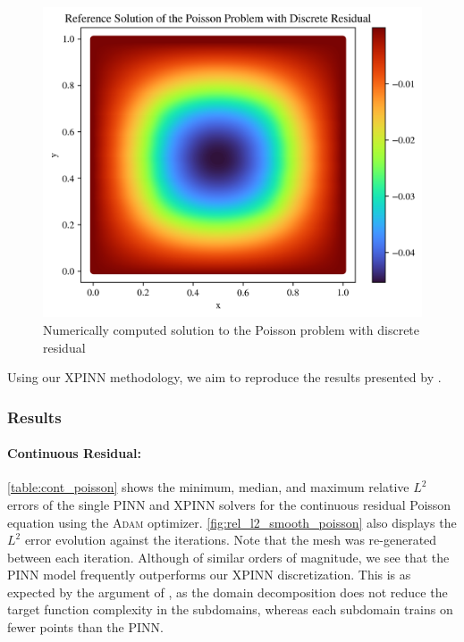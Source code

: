 \begin{figure}
    \centering
    \includegraphics{Project1XPINNs/figures/Poisson/Exact_Discrete.png}
    \caption{Numerically computed solution to the Poisson problem with discrete residual}
    \label{fig:exact_discrete}
\end{figure}


Using our XPINN methodology, we aim to reproduce the results presented by \textcite{XPINN_generalize}.

\subsubsection{Results}
\paragraph{Continuous Residual:}
\autoref{table:cont_poisson} shows the minimum, median, and maximum relative $L^2$ errors of the single PINN and XPINN solvers for the continuous residual Poisson equation using the \textsc{Adam} optimizer. \autoref{fig:rel_l2_smooth_poisson} also displays the $L^2$ error evolution against the iterations. Note that the mesh was re-generated between each iteration. Although of similar orders of magnitude, we see that the PINN model frequently outperforms our XPINN discretization. This is as expected by the argument of \textcite{XPINN_generalize}, as the domain decomposition does not reduce the target function
complexity in the subdomains, whereas each subdomain trains on fewer points than the PINN. 

